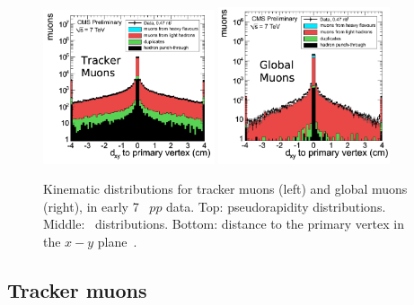 \begin{figure}[!htb]
\begin{center}
    \includegraphics[width=0.45\textwidth]{Chapters/xLHCMS/TrkMuon_dxy.png}
    \includegraphics[width=0.45\textwidth]{Chapters/xLHCMS/GlbMuon_dxy.png}
    \caption{Kinematic distributions for tracker muons (left) and global
      muons (right), in early 7 \TeV\ $pp$ data. Top: pseudorapidity
      distributions.  Middle: \pt\ distributions. Bottom:
      distance to the primary vertex in the $x-y$ plane~\cite{muo}.} 
    \label{fig:muonpogplot}
  \end{center}
\end{figure}

\subsection{Tracker muons}
\label{sec:TRK}

